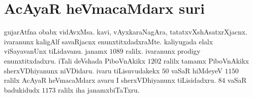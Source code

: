 \section*{\text AcAyaR heVmacaMdarx suri}
gujarAtfna obabx vidAvxMsa. kavi, vAyxkaraNagAra, tatatxvXshAsatxrXjacnx. ivaranunx kaligAlf savaRjacnx enunxtitxdadxraMte. kaliyugada elalx viSayavanUnx tiLidavanu. janamx $1089$ ralilx. ivaranunx {\rm prodigy} enunxtitxdadxru. iTali deVshada PiboVnAkikx $1202$ ralilx  tamamx PiboVnAkikx sherxVDhiyanunx niVDidaru. ivaru tiLisuvudakekx $50$ vaSaR hiMdeyeV $1150$ ralilx AcAyaR heVmacaMdarx avaru I sherxVDhiyanunx tiLisidadxru. $84$ vaSaR badukidudx $1173$ ralilx iha janamxbiTaTxru.
